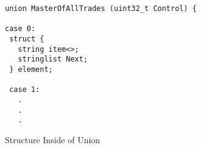 \begin{figure}
\begin{verbatim}
union MasterOfAllTrades (uint32_t Control) {

case 0:
 struct {
   string item<>;
   stringlist Next;
 } element;

 case 1:
   .
   .
   .
\end{verbatim}
\caption{Structure Inside of Union}
\label{fig:StructInFigure}
\end{figure}
